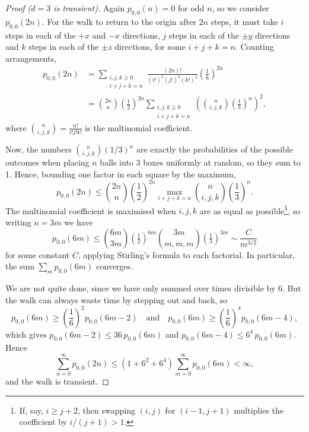 \documentclass[a4paper]{scrartcl}
\begin{document}
\begin{proof}[Proof ($d = 3$ is transient)]
	Again $p_{0, 0}(n) = 0$ for odd $n$, so we consider $p_{0, 0}(2n)$. For the walk to return to the origin after $2n$ steps, it must take $i$ steps in each of the $+x$ and $-x$ directions, $j$ steps in each of the $\pm y$ directions and $k$ steps in each of the $\pm z$ directions, for some $i + j + k = n$. Counting arrangements,
	\begin{align*}
	p_{0, 0}(2n) &= \sum_{\substack{i, j, k \geq 0 \\ i + j + k = n}} \frac{(2n)!}{(i!)^2 (j!)^2 (k!)^2} \left(\frac{1}{6}\right)^{2n} \\
	&= \binom{2n}{n} \left(\frac{1}{2}\right)^{2n} \sum_{\substack{i, j, k \geq 0 \\ i + j + k = n}} \left(\binom{n}{i, j, k} \left(\frac{1}{3}\right)^{n}\right)^2,
	\end{align*}
	where $\binom{n}{i, j, k} = \frac{n!}{i! j! k!}$ is the multinomial coefficient.

	Now, the numbers $\binom{n}{i, j, k} (1/3)^n$ are exactly the probabilities of the possible outcomes when placing $n$ balls into 3 boxes uniformly at random, so they sum to 1. Hence, bounding one factor in each square by the maximum,
	$$
	p_{0, 0}(2n) \leq \binom{2n}{n} \left(\frac{1}{2}\right)^{2n} \max_{i + j + k = n}\binom{n}{i, j, k} \left(\frac{1}{3}\right)^{n}.
	$$
	The multinomial coefficient is maximised when $i, j, k$ are as equal as possible\footnote{If, say, $i \geq j + 2$, then swapping $(i, j)$ for $(i - 1, j + 1)$ multiplies the coefficient by $i/(j + 1) > 1$.}, so writing $n = 3m$ we have
	$$
	p_{0, 0}(6m) \leq \binom{6m}{3m} \left(\tfrac{1}{2}\right)^{6m} \binom{3m}{m, m, m}\left(\tfrac{1}{3}\right)^{3m} \sim \frac{C}{m^{3/2}}
	$$
	for some constant $C$, applying Stirling's formula to each factorial. In particular, the sum $\sum_{m} p_{0, 0}(6m)$ converges.

	We are not quite done, since we have only summed over times divisible by 6. But the walk can always waste time by stepping out and back, so
	$$
	p_{0, 0}(6m) \geq \left(\frac{1}{6}\right)^2 p_{0, 0}(6m - 2) \quad \text{and} \quad p_{0, 0}(6m) \geq \left(\frac{1}{6}\right)^4 p_{0, 0}(6m - 4),
	$$
	which gives $p_{0, 0}(6m - 2) \leq 36\, p_{0, 0}(6m)$ and $p_{0, 0}(6m - 4) \leq 6^4\, p_{0, 0}(6m)$. Hence
	$$
	\sum_{n = 0}^{\infty} p_{0, 0}(2n) \leq (1 + 6^2 + 6^4)\sum_{m = 0}^{\infty} p_{0, 0}(6m) < \infty,
	$$
	and the walk is transient.
\end{proof}
\end{document}
